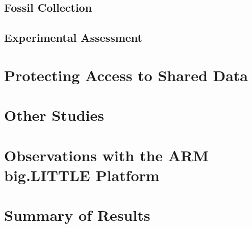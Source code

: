 \documentclass[11pt]{book}
\begin{document}
\section{Fossil Collection}


\section{Experimental Assessment}


\chapter{Protecting Access to Shared Data}\label{protection}


\chapter{Other Studies}\label{other}


\chapter{Observations with the ARM big.LITTLE Platform}\label{big_little}


\chapter{Summary of Results}\label{results_summary}


\end{document}
